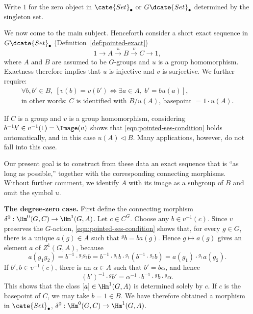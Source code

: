 \begin{convention}
	Write $1$ for the zero object in $\cate{Set}_\bullet$ or
	$G\dcate{Set}_\bullet$ determined by the singleton set.
\end{convention}

We now come to the main subject. Henceforth consider a short exact sequence
in $G\dcate{Set}_\bullet$ (Definition~\ref{def:pointed-exact})
\[ 1 \to A \xrightarrow{u} B \xrightarrow{v} C \to 1, \]
where $A$ and $B$ are assumed to be $G$-groups and $u$ is a group
homomorphism. Exactness therefore implies that $u$ is injective and $v$ is
surjective. We further require:
\begin{equation}\label{eqn:pointed-ses-condition}
	\begin{gathered}
		\forall b, b' \in B, \; \left[ v(b) = v(b') \iff \exists a \in A, \; b' = b u(a) \right], \\
		\text{in other words: $C$ is identified with $B/u(A)$, basepoint $= 1 \cdot u(A)$.}
	\end{gathered}
\end{equation}

If $C$ is a group and $v$ is a group homomorphism, considering
$b^{-1}b'\in v^{-1}(1)=\Image(u)$ shows that
\eqref{eqn:pointed-ses-condition} holds automatically, and in this case
$u(A)\lhd B$. Many applications, however, do not fall into this case.

Our present goal is to construct from these data an exact sequence that is
``as long as possible,'' together with the corresponding connecting
morphisms. Without further comment, we identify $A$ with its image as a
subgroup of $B$ and omit the symbol $u$.

\textbf{The degree-zero case.}\;
First define the connecting morphism
$\delta^0:\Hm^0(G,C)\to\Hm^1(G,A)$. Let $c\in C^G$. Choose any
$b\in v^{-1}(c)$. Since $v$ preserves the $G$-action,
\eqref{eqn:pointed-ses-condition} shows that, for every $g\in G$, there is
a unique $a(g)\in A$ such that ${}^gb=ba(g)$. Hence $g\mapsto a(g)$ gives
an element $a$ of $Z^1(G,A)$, because
\[ a(g_1 g_2) = b^{-1} \cdot {}^{g_1 g_2} b = b^{-1} \cdot {}^{g_1} b \cdot {}^{g_1} (b^{-1} \cdot {}^{g_2} b) = a(g_1) \cdot {}^{g_1} a(g_2). \]
If $b',b\in v^{-1}(c)$, there is an $\alpha\in A$ such that
$b'=b\alpha$, and hence
\[ (b')^{-1} \cdot {}^g b' = \alpha^{-1} \cdot b^{-1} \cdot {}^g b \cdot {}^g \alpha. \]
This shows that the class $[a]\in\Hm^1(G,A)$ is determined solely by $c$.
If $c$ is the basepoint of $C$, we may take $b=1\in B$. We have therefore
obtained a morphism in $\cate{Set}_\bullet$,
$\delta^0:\Hm^0(G,C)\to\Hm^1(G,A)$.

